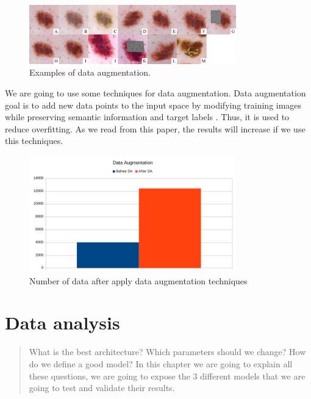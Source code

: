 \begin{figure}[H]
\centering
\includegraphics[width=0.8\textwidth]{./figures/data-augmentation}
\caption{Examples of data augmentation. \cite{data-augmentation-skin}}
\label{fig:dataaugentation}
\end{figure}

We are going to use some techniques for data augmentation. Data augmentation goal is to add new data
points to the input space by modifying training images while preserving semantic 
information and target labels \cite{data-augmentation-skin}. Thus, it is used to reduce overfitting. As we read from this paper, the results will increase if we use this techniques.


\begin{figure}[H]
\centering
\includegraphics[width=0.8\textwidth]{./figures/data-augmentation-plot}
\caption{Number of data after apply data augmentation techniques}
\end{figure}

\chapter{Data analysis}

\begin{abstract}
What is the best architecture? Which parameters should we change? How do we define a good model? In this chapter we are going to explain all these questions, we are going to expose the 3 different models that we are going to test and validate their results.

\end{abstract}

